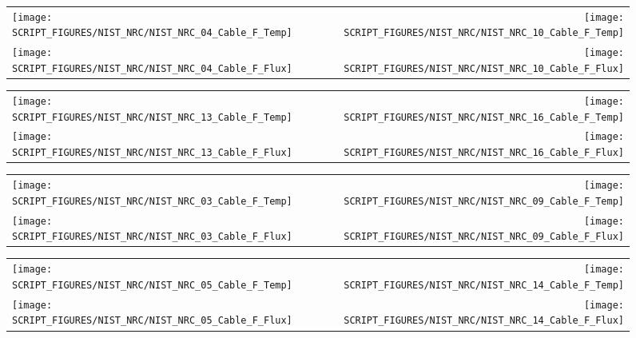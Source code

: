 \clearpage

\begin{figure}[p]
\begin{tabular*}{\textwidth}{l@{\extracolsep{\fill}}r}
\texttt{[image: SCRIPT\_FIGURES/NIST\_NRC/NIST\_NRC\_04\_Cable\_F\_Temp]} &
\texttt{[image: SCRIPT\_FIGURES/NIST\_NRC/NIST\_NRC\_10\_Cable\_F\_Temp]} \\
\texttt{[image: SCRIPT\_FIGURES/NIST\_NRC/NIST\_NRC\_04\_Cable\_F\_Flux]} &
\texttt{[image: SCRIPT\_FIGURES/NIST\_NRC/NIST\_NRC\_10\_Cable\_F\_Flux]}
\end{tabular*}
\label{NIST_NRC_F_4_and_10}
\end{figure}

\begin{figure}[p]
\begin{tabular*}{\textwidth}{l@{\extracolsep{\fill}}r}
\texttt{[image: SCRIPT\_FIGURES/NIST\_NRC/NIST\_NRC\_13\_Cable\_F\_Temp]} &
\texttt{[image: SCRIPT\_FIGURES/NIST\_NRC/NIST\_NRC\_16\_Cable\_F\_Temp]} \\
\texttt{[image: SCRIPT\_FIGURES/NIST\_NRC/NIST\_NRC\_13\_Cable\_F\_Flux]} &
\texttt{[image: SCRIPT\_FIGURES/NIST\_NRC/NIST\_NRC\_16\_Cable\_F\_Flux]}
\end{tabular*}
\label{NIST_NRC_F_13_and_16}
\end{figure}

\clearpage

\begin{figure}[p]
\begin{tabular*}{\textwidth}{l@{\extracolsep{\fill}}r}
\texttt{[image: SCRIPT\_FIGURES/NIST\_NRC/NIST\_NRC\_03\_Cable\_F\_Temp]} &
\texttt{[image: SCRIPT\_FIGURES/NIST\_NRC/NIST\_NRC\_09\_Cable\_F\_Temp]} \\
\texttt{[image: SCRIPT\_FIGURES/NIST\_NRC/NIST\_NRC\_03\_Cable\_F\_Flux]} &
\texttt{[image: SCRIPT\_FIGURES/NIST\_NRC/NIST\_NRC\_09\_Cable\_F\_Flux]}
\end{tabular*}
\label{NIST_NRC_F_3_and_9}
\end{figure}

\begin{figure}[p]
\begin{tabular*}{\textwidth}{l@{\extracolsep{\fill}}r}
\texttt{[image: SCRIPT\_FIGURES/NIST\_NRC/NIST\_NRC\_05\_Cable\_F\_Temp]} &
\texttt{[image: SCRIPT\_FIGURES/NIST\_NRC/NIST\_NRC\_14\_Cable\_F\_Temp]} \\
\texttt{[image: SCRIPT\_FIGURES/NIST\_NRC/NIST\_NRC\_05\_Cable\_F\_Flux]} &
\texttt{[image: SCRIPT\_FIGURES/NIST\_NRC/NIST\_NRC\_14\_Cable\_F\_Flux]}
\end{tabular*}
\label{NIST_NRC_F_5_and_14}
\end{figure}

